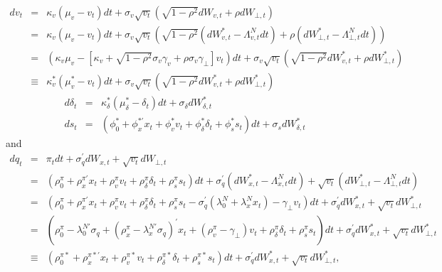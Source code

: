 \documentclass{article}
\begin{document}
\begin{eqnarray*}
dv_{t} &=&\kappa _{v}\left( \mu _{v}-v_{t}\right) dt+\sigma _{v}\sqrt{v_{t}}%
\left( \sqrt{1-\rho ^{2}}dW_{v,t}+\rho dW_{\bot ,t}\right) \\
&=&\kappa _{v}\left( \mu _{v}-v_{t}\right) dt+\sigma _{v}\sqrt{v_{t}}\left( 
\sqrt{1-\rho ^{2}}\left( dW_{v,t}^{\ast }-\Lambda _{v,t}^{N}dt\right) +\rho
\left( dW_{\bot ,t}^{\ast }-\Lambda _{\bot ,t}^{N}dt\right) \right) \\
&=&\left( \kappa _{v}\mu _{v}-\left[ \kappa _{v}+\sqrt{1-\rho ^{2}}\sigma
_{v}\gamma _{v}+\rho \sigma _{v}\gamma _{\bot }\right] v_{t}\right)
dt+\sigma _{v}\sqrt{v_{t}}\left( \sqrt{1-\rho ^{2}}dW_{v,t}^{\ast }+\rho
dW_{\bot ,t}^{\ast }\right) \text{ \ \ \ } \\
&\equiv &\kappa _{v}^{\ast }\left( \mu _{v}^{\ast }-v_{t}\right) dt+\sigma
_{v}\sqrt{v_{t}}\left( \sqrt{1-\rho ^{2}}dW_{v,t}^{\ast }+\rho dW_{\bot
,t}^{\ast }\right)
\end{eqnarray*}%
\begin{eqnarray*}
d\delta _{t} &=&\kappa _{\delta }^{\ast }\left( \mu _{\delta }^{\ast
}-\delta _{t}\right) dt+\sigma _{\delta }dW_{\delta ,t}^{\ast } \\
ds_{t} &=&\left( \phi _{0}^{\ast }+\phi _{x}^{\ast \prime }x_{t}+\phi
_{v}^{\ast }v_{t}+\phi _{\delta }^{\ast }\delta _{t}+\phi _{s}^{\ast
}s_{t}\right) dt+\sigma _{s}dW_{\delta ,t}^{\ast }
\end{eqnarray*}%
and%
\begin{eqnarray*}
dq_{t} &=&\pi _{t}dt+\sigma _{q}^{\prime }dW_{x,t}+\sqrt{v_{t}}dW_{\bot ,t}
\\
&=&\left( \rho _{0}^{\pi }+\rho _{x}^{\pi \prime }x_{t}+\rho _{v}^{\pi
}v_{t}+\rho _{\delta }^{\pi }\delta _{t}+\rho _{s}^{\pi }s_{t}\right)
dt+\sigma _{q}^{\prime }\left( dW_{x,t}^{\ast }-\Lambda _{x,t}^{N}dt\right) +%
\sqrt{v_{t}}\left( dW_{\bot ,t}^{\ast }-\Lambda _{\bot ,t}^{N}dt\right) \\
&=&\left( \rho _{0}^{\pi }+\rho _{x}^{\pi \prime }x_{t}+\rho _{v}^{\pi
}v_{t}+\rho _{\delta }^{\pi }\delta _{t}+\rho _{s}^{\pi }s_{t}-\sigma
_{q}^{\prime }\left( \lambda _{0}^{N}+\lambda _{x}^{N}x_{t}\right) -\gamma
_{\bot }v_{t}\right) dt+\sigma _{q}^{\prime }dW_{x,t}^{\ast }+\sqrt{v_{t}}%
dW_{\bot ,t}^{\ast } \\
&=&\left( \rho _{0}^{\pi }-\lambda _{0}^{N\prime }\sigma _{q}+\left( \rho
_{x}^{\pi }-\lambda _{x}^{N\prime }\sigma _{q}\right) ^{\prime }x_{t}+\left(
\rho _{v}^{\pi }-\gamma _{\bot }\right) v_{t}+\rho _{\delta }^{\pi }\delta
_{t}+\rho _{s}^{\pi }s_{t}\right) dt+\sigma _{q}^{\prime }dW_{x,t}^{\ast }+%
\sqrt{v_{t}}dW_{\bot ,t}^{\ast } \\
&\equiv &\left( \rho _{0}^{\pi \ast }+\rho _{x}^{\pi \ast \prime }x_{t}+\rho
_{v}^{\pi \ast }v_{t}+\rho _{\delta }^{\pi \ast }\delta _{t}+\rho _{s}^{\pi
\ast }s_{t}\right) dt+\sigma _{q}^{\prime }dW_{x,t}^{\ast }+\sqrt{v_{t}}%
dW_{\bot ,t}^{\ast },
\end{eqnarray*}%
\end{document}
